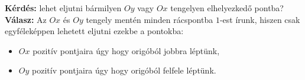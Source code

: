 \noindent\textbf{Kérdés:} {\color{ccqqqq}{Hányféleképpen}} lehet eljutni
bármilyen $Oy$ vagy $Ox$ tengelyen elhelyezkedő pontba? \\
 \textbf{Válasz:} Az $Ox$ és $Oy$ tengely mentén minden rácspontba
$1$-est írunk, hiszen csak egyféleképpen lehetett eljutni ezekbe
a pontokba: 
\begin{itemize}
\item $Ox$ pozitív pontjaira úgy hogy origóból jobbra léptünk, 
\item $Oy$ pozitív pontjaira úgy hogy origóból felfele léptünk. 
\end{itemize}
\begin{center}
\par\end{center}

